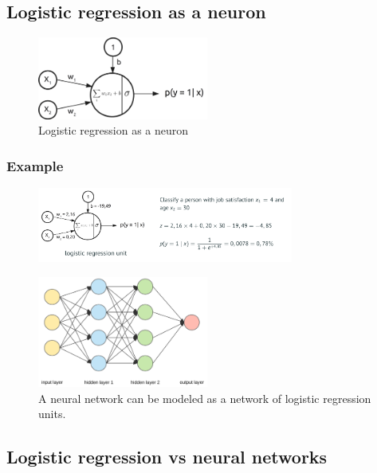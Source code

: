 \documentclass{article}
\begin{document}
\subsection{Logistic regression as a neuron}

\begin{figure}[H]
    \centering
    \includegraphics[width=0.5\textwidth]{logistic-regression-neuron.png}
    \caption{Logistic regression as a neuron}
\end{figure}

\subsubsection{Example}

\begin{figure}[H]
    \centering
    \includegraphics[width=0.75\textwidth]{img/logistic-regression-neuron-example.png}
\end{figure}

\begin{figure}[H]
    \centering
    \includegraphics[width=0.5\textwidth]{img/neural-network-logistic-regression-units.png}
    \caption{A neural network can be modeled as a network of logistic regression units.}
\end{figure}

\subsection{Logistic regression vs neural networks}
\end{document}
